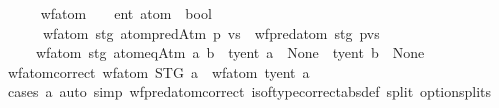 \begin{isabellebody}
\endisatagproof
{\isafoldproof}%
%
\isadelimproof
\isanewline
%
\endisadelimproof
\isanewline
\ \ \ \ \isamarkupfalse%
\ wf{\isacharunderscore}{\kern0pt}atom{\isacharprime}{\kern0pt}\ {\isacharcolon}{\kern0pt}{\isacharcolon}{\kern0pt}\ {\isachardoublequoteopen}{\isacharunderscore}{\kern0pt}\ {\isasymRightarrow}\ {\isacharprime}{\kern0pt}ent\ atom\ {\isasymRightarrow}\ bool{\isachardoublequoteclose}\ \isanewline
\ \ \ \ \ \ {\isachardoublequoteopen}wf{\isacharunderscore}{\kern0pt}atom{\isacharprime}{\kern0pt}\ stg\ {\isacharparenleft}{\kern0pt}atom{\isachardot}{\kern0pt}predAtm\ p\ vs{\isacharparenright}{\kern0pt}\ {\isasymlongleftrightarrow}\ wf{\isacharunderscore}{\kern0pt}pred{\isacharunderscore}{\kern0pt}atom{\isacharprime}{\kern0pt}\ stg\ {\isacharparenleft}{\kern0pt}p{\isacharcomma}{\kern0pt}vs{\isacharparenright}{\kern0pt}{\isachardoublequoteclose}\isanewline
\ \ \ \ {\isacharbar}{\kern0pt}\ {\isachardoublequoteopen}wf{\isacharunderscore}{\kern0pt}atom{\isacharprime}{\kern0pt}\ stg\ {\isacharparenleft}{\kern0pt}atom{\isachardot}{\kern0pt}eqAtm\ a\ b{\isacharparenright}{\kern0pt}\ {\isacharequal}{\kern0pt}\ {\isacharparenleft}{\kern0pt}ty{\isacharunderscore}{\kern0pt}ent\ a\ {\isasymnoteq}\ None\ {\isasymand}\ ty{\isacharunderscore}{\kern0pt}ent\ b\ {\isasymnoteq}\ None{\isacharparenright}{\kern0pt}{\isachardoublequoteclose}\isanewline
\isanewline
\ \ \ \ \isamarkupfalse%
\ wf{\isacharunderscore}{\kern0pt}atom{\isacharprime}{\kern0pt}{\isacharunderscore}{\kern0pt}correct{\isacharcolon}{\kern0pt}\ {\isachardoublequoteopen}wf{\isacharunderscore}{\kern0pt}atom{\isacharprime}{\kern0pt}\ STG\ a\ {\isacharequal}{\kern0pt}\ wf{\isacharunderscore}{\kern0pt}atom\ ty{\isacharunderscore}{\kern0pt}ent\ a{\isachardoublequoteclose}\isanewline
%
\isadelimproof
\ \ \ \ \ \ %
\endisadelimproof
%
\isatagproof
{}\isamarkupfalse%
\ {\isacharparenleft}{\kern0pt}cases\ a{\isacharparenright}{\kern0pt}\ {\isacharparenleft}{\kern0pt}auto\ simp{\isacharcolon}{\kern0pt}\ wf{\isacharunderscore}{\kern0pt}pred{\isacharunderscore}{\kern0pt}atom{\isacharprime}{\kern0pt}{\isacharunderscore}{\kern0pt}correct\ is{\isacharunderscore}{\kern0pt}of{\isacharunderscore}{\kern0pt}type{\isacharprime}{\kern0pt}{\isacharunderscore}{\kern0pt}correct{\isacharbrackleft}{\kern0pt}abs{\isacharunderscore}{\kern0pt}def{\isacharbrackright}{\kern0pt}\ split{\isacharcolon}{\kern0pt}\ option{\isachardot}{\kern0pt}splits{\isacharparenright}{\kern0pt}%
\endisatagproof
{\isafoldproof}%
%
\isadelimproof
\isanewline
%
\endisadelimproof

\end{isabellebody}
